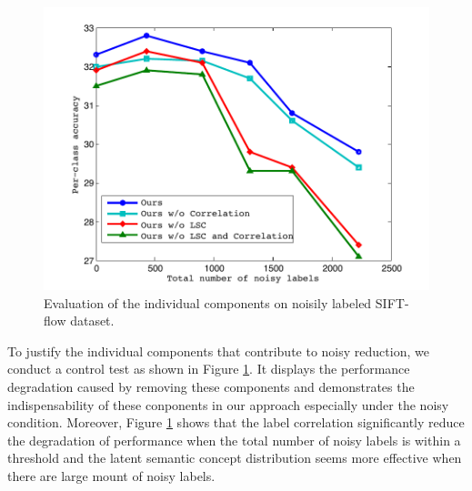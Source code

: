 \begin{figure}[htb]
\begin{center}
    \includegraphics[width=1\linewidth]{fig_noisylabel.pdf}
\end{center}
\vspace{-3mm}
\caption{Evaluation of the individual components on noisily labeled SIFT-flow dataset.}
\label{fig:noisyexp}
\end{figure}

To justify the individual components that contribute to noisy reduction, we conduct a control test as shown in Figure \ref{fig:noisyexp}. It displays the performance degradation caused by removing these components and demonstrates the indispensability of these conponents in our approach especially under the noisy condition. Moreover, Figure \ref{fig:noisyexp} shows that the label correlation significantly reduce the degradation of performance when the total number of noisy labels is within a threshold and the latent semantic concept distribution seems more effective when there are large mount of noisy labels.




